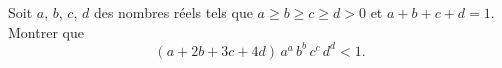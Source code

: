 Soit $a$, $b$, $c$, $d$ des nombres réels tels que $a \geqslant b \geqslant c
\geqslant d > 0$ et $a + b + c + d = 1$. Montrer que
\[
(a + 2b + 3c + 4d)\, a^{a}\, b^{b}\, c^{c}\, d^{d} < 1.
\]
